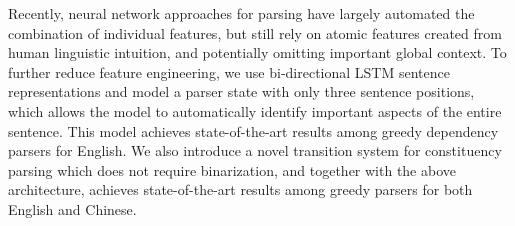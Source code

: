 Recently, neural network approaches for parsing have largely automated the combination of individual features,  but still rely on atomic features created from human linguistic intuition, and potentially omitting important global context. To further reduce feature engineering, we use bi-directional LSTM sentence representations and model a parser state with only three sentence positions, which allows the model to automatically identify important aspects of the entire sentence. This model achieves state-of-the-art results among greedy dependency parsers for English. We also introduce a novel transition system for constituency parsing which does not require binarization, and together with the above architecture, achieves state-of-the-art results among greedy parsers for both English and Chinese.
